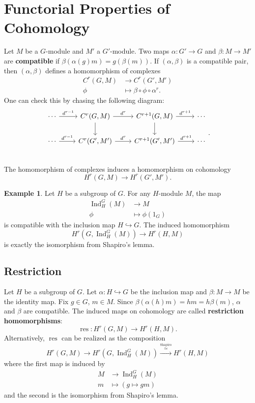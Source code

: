 \documentclass[class=article, crop=false]{standalone}
\newcommand{\Ind}{\operatorname{Ind}}
\newcommand{\res}{\operatorname{res}}
\theoremstyle{definition}
\newtheorem{example}{Example}[section]
\begin{document}
\section{Functorial Properties of Cohomology}
Let $M$ be a $G$-module and $M'$ a $G'$-module. Two maps $\alpha:G'\to G$ and $\beta:M\to M'$ are \textbf{compatible} if $\beta(\alpha(g)m)=g(\beta(m))$. If $(\alpha,\beta)$ is a compatible pair, then $(\alpha,\beta)$ defines a homomorphism of complexes
\begin{align*}
	C^{r}(G,M)&\to C^{r}(G',M')\\
	\phi&\mapsto\beta\circ\phi\circ\alpha^{r}
.\end{align*}
One can check this by chasing the following diagram:
\[
\begin{tikzcd}
	\cdots\ar{r}{d^{r-1}} & C^{r}(G,M)\ar{r}{d^{r}}\ar[d] & C^{r+1}(G,M)\ar{r}{d^{r+1}}\ar[d] & \cdots\\
	\cdots\ar{r}{d^{r-1}} & C^{r}(G',M')\ar{r}{d^{r}} & C^{r+1}(G',M')\ar{r}{d^{r+1}} & \cdots\\
\end{tikzcd}
.\]
The homomorphism of complexes induces a homomorphism on cohomology
\[
	H^{r}(G,M)\to H^{r}(G',M')
.\]
\begin{example}
Let $H$ be a subgroup of $G$. For any $H$-module $M$, the map
\begin{align*}
	\Ind^{G}_H(M)&\to M\\
	\phi&\mapsto \phi(1_G)
\end{align*}
is compatible with the inclusion map $H\hookrightarrow G$. The induced homomorphism
\[
	H^{r}(G,\Ind^{G}_H(M))\to H^{r}(H,M)
\] 
is exactly the isomorphism from Shapiro's lemma.
\end{example}
\subsection{Restriction} 
Let $H$ be a subgroup of $G$. Let $\alpha:H\hookrightarrow G$ be the inclusion map and $\beta:M\to M$ be the identity map. Fix $g\in G$, $m\in M$. Since $\beta(\alpha(h)m)=hm=h\beta(m)$, $\alpha$ and $\beta$ are compatible. The induced maps on cohomology are called \textbf{restriction homomorphisms}:
\[
	\res:H^{r}(G,M)\to H^{r}(H,M)
.\] 
Alternatively, $\res$ can be realized as the composition
\[
	H^{r}(G,M)\to H^{r}(G,\Ind^{G}_H(M))\xrightarrow{\overset{\text{Shapiro}}{\simeq}} H^{r}(H,M)
\] 
where the first map is induced by  
\begin{align*}
	M&\to\Ind^{G}_H(M)\\
	m&\mapsto (g\mapsto gm)
\end{align*}
and the second is the isomorphism from Shapiro's lemma.
\end{document}
